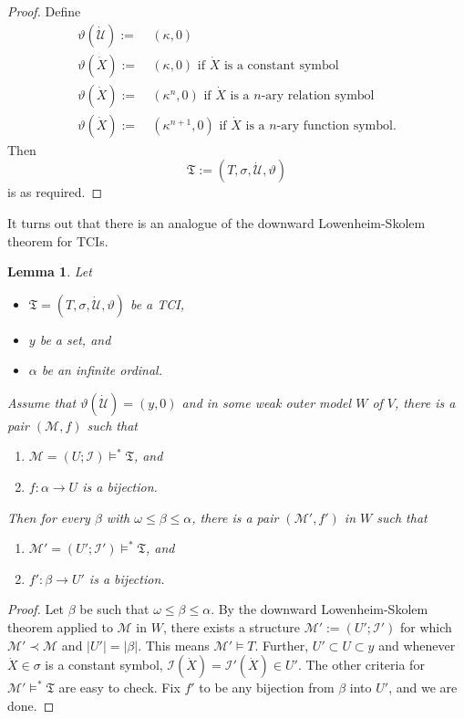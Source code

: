 \documentclass[12pt, twoside]{memoir}
\numberwithin{equation}{section}
\newtheorem{lem}[thm]{Lemma}
\theoremstyle{definition}
\theoremstyle{remark}
\theoremstyle{definition}
\theoremstyle{definition}
\theoremstyle{definition}
\theoremstyle{remark}
\begin{document}
\begin{proof}
Define 
\begin{align*} 
    \vartheta (\dot{\mathcal{U}}) := \ & (\kappa, 0) \\
    \vartheta (\dot{X}) := \ & (\kappa, 0) \text{ if } \dot{X} \text{ is a constant symbol} \\
    \vartheta (\dot{X}) := \ & (\kappa^n, 0)  \text{ if } \dot{X} \text{ is a } n \text{-ary relation symbol} \\
    \vartheta (\dot{X}) := \ & (\kappa^{n + 1}, 0)  \text{ if } \dot{X} \text{ is a } n \text{-ary function symbol.} 
\end{align*}
Then $$\mathfrak{T} := (T, \sigma, \dot{\mathcal{U}}, \vartheta)$$ is as required.
\end{proof}

It turns out that there is an analogue of the downward Lowenheim-Skolem theorem for TCIs.

\begin{lem}\label{DLS}
Let 
\begin{itemize}
    \item $\mathfrak{T} = (T, \sigma, \dot{\mathcal{U}}, \vartheta)$ be a TCI,
    \item $y$ be a set, and
    \item $\alpha$ be an infinite ordinal. 
\end{itemize}
Assume that $\vartheta(\dot{\mathcal{U}}) = (y, 0)$ and in some weak outer model $W$ of $V$, there is a pair $(\mathcal{M}, f)$ such that
\begin{enumerate}[label=(\alph*)]
    \item $\mathcal{M} = (U; \mathcal{I}) \models^* \mathfrak{T}$, and
    \item $f : \alpha \longrightarrow U$ is a bijection.
\end{enumerate}
Then for every $\beta$ with $\omega \leq \beta \leq \alpha$, there is a pair $(\mathcal{M}', f')$ in $W$ such that 
\begin{enumerate}[label=(\alph*)']
    \item $\mathcal{M}' = (U'; \mathcal{I}') \models^* \mathfrak{T}$, and
    \item $f' : \beta \longrightarrow U'$ is a bijection.
\end{enumerate}
\end{lem}

\begin{proof}
Let $\beta$ be such that $\omega \leq \beta \leq \alpha$. By the downward Lowenheim-Skolem theorem applied to $\mathcal{M}$ in $W$, there exists a structure $\mathcal{M}' := (U'; \mathcal{I}')$ for which $\mathcal{M}' \prec \mathcal{M}$ and $|U'| = |\beta|$. This means $\mathcal{M'} \models T$. Further, $U' \subset U \subset y$ and whenever $\dot{X} \in \sigma$ is a constant symbol, $\mathcal{I}(\dot{X}) = \mathcal{I}'(\dot{X}) \in U'$. The other criteria for $\mathcal{M}' \models^* \mathfrak{T}$ are easy to check. Fix $f'$ to be any bijection from $\beta$ into $U'$, and we are done.
\end{proof}
\end{document}
